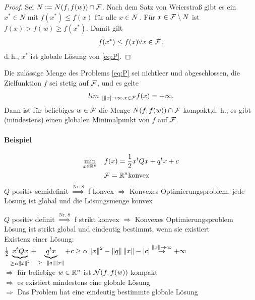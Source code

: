 \begin{proof}
Sei $N := N (f, f(w)) \cap \mathcal{F}$. Nach dem Satz von Weierstraß gibt es ein $x^* \in N$ mit $f(x^*) \leq f(x)$ für alle $x \in N$ . Für $x \in \mathcal{F} \setminus N$ ist $f(x) > f(w) \geq f(x^*)$. Damit gilt
\begin{align*}
f (x^*) \leq f(x) \forall x \in \mathcal{F} \,,
\end{align*}
d.\,h., $x^*$ ist globale Lösung von \eqref{eq:P}.
\end{proof}

\begin{Lemma}
Die zulässige Menge des Problems \eqref{eq:P} sei nichtleer und abgeschlossen, die Zielfunktion $f$ sei stetig auf $\mathcal{F}$, und es gelte
\begin{align*}
lim_{\left\lVert[\right\rVert x] \rightarrow \infty, x \in \mathcal{F}} f(x) = + \infty .
\end{align*}
Dann ist für beliebiges $w \in \mathcal{F}$ die Menge $N(f, f(w))\cap \mathcal{F}$ kompakt,d. h., es gibt (mindestens) einen globalen Minimalpunkt von $f$ auf $\mathcal{F}$.
\end{Lemma}

\paragraph{Beispiel}
	\begin{gather*} 
  			\begin{aligned}
    			\min_{x \in \mathbb R^n}
    			& & & f(x)=\frac{1}{2}x^tQx+q^tx+c \\
    			& & & \mathcal{F}=\mathbb R^n \text{konvex}
  			\end{aligned}
	\end{gather*}
$Q$ positiv semidefinit $\overset{\text{Nr. 8}}\Rightarrow$ f konvex $\Rightarrow$ Konvexes Optimierungsproblem, jede Lösung ist global und die Lösungsmenge konvex

$Q$ positiv definit $\overset{\text{Nr. 8}}\Rightarrow$ f strikt konvex $\Rightarrow$ Konvexes Optimierungsproblem\\
Lösung ist strikt global und eindeutig bestimmt, wenn sie existiert\\
Existenz einer Lösung: $\frac{1}{2}\underbrace{x^tQx}_{\geq\alpha\left\lVert x\right\rVert^2}+\underbrace{q^tx}_{\geq-\left\lVert q\right\rVert\left\lVert x\right\rVert}+c\geq \alpha\left\lVert x\right\rVert^2-\left\lVert q\right\rVert\left\lVert x\right\rVert-|c|\overset{\left\lVert x\right\rVert\rightarrow\infty}{\rightarrow}+\infty$\\
$\Rightarrow$ für beliebige $w\in\mathbb R^n$ ist $\mathcal{N}(f,f(w))$ kompakt\\
$\Rightarrow$ es existiert mindestens eine globale Lösung\\
$\Rightarrow$ Das Problem hat eine eindeutig bestimmte globale Lösung\\
